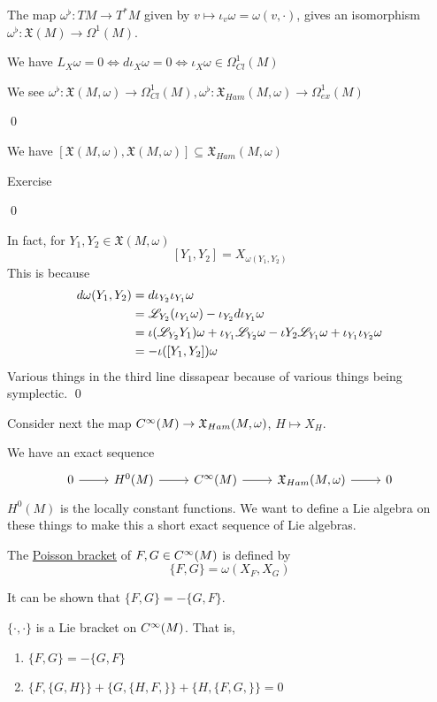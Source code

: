 \documentclass[x11names,reqno,14pt]{extarticle}
\newcommand{\mk}[1]{\mathfrak{#1}}
\newcommand{\pois}[2]{\{#1,#2\}}
\begin{document}
\proof

The map $\omega^\flat:TM\to T^*M$ given by $v \mapsto \iota_v\omega = \omega(v,\cdot)$, gives an isomorphism $\omega^\flat:\mk{X}(M)\to\Omega^1(M)$. 

We have $L_X\omega=0 \iff d\iota_X\omega = 0 \iff \iota_X\omega \in \Omega^1_{Cl}(M)$

We see $\omega^\flat:\mk{X}(M,\omega)\to \Omega^1_{Cl}(M), \omega^\flat:\mk{X}_{Ham}(M,\omega) \to \Omega^1_{ex}(M)$

\qed

\prop

We have $[\mk{X}(M,\omega),\mk{X}(M,\omega)]\subseteq\mk{X}_{Ham}(M,\omega)$

\proof

Exercise

\qed

\prop


In fact, for $Y_1,Y_2 \in \mk{X}(M,\omega)$
\[
[Y_1,Y_2] = X_{\omega(Y_1,Y_2)}
\]
\proof
This is because 
\begin{align*}
d\omega(Y_1,Y_2) & = d\iota_{Y_2}\iota_{Y_1}\omega \\
& = \mathscr{L}_{Y_2}(\iota_{Y_1}\omega) - \iota_{Y_2}d\iota_{Y_1}\omega \\
& = \iota(\mathscr{L}_{Y_2}Y_1)\omega + \iota_{Y_1}\mathscr{L}_{Y_2}\omega - \iota{Y_2}\mathscr{L}_{Y_1}\omega + \iota_{Y_1}\iota_{Y_2}\omega \\
& = -\iota([Y_1,Y_2])\omega
\end{align*}
Various things in the third line dissapear because of various things being symplectic.
\qed

Consider next the map $C^\oo(M) \to \mk{X}_{Ham}(M,\omega)$, $H \mapsto X_H$.

We have an exact sequence
\[
\exactshort{H^0(M)}{}{C^\oo(M)}{}{\mk{X}_{Ham}(M,\omega)}
\]
$H^0(M)$ is the locally constant functions. We want to define a Lie algebra on these things to make this a short exact sequence of Lie algebras. 


The \underline{Poisson bracket} of $F, G \in C^\infty(M)$ is defined by 
\[
\{F, G\} = \omega(X_F,X_G)
\]

It can be shown that $\{F,G\} = -\{G,F\}$.

\prop

$\{\cdot,\cdot\}$ is a Lie bracket on $C^\infty(M)$. That is, 
\begin{enumerate}

\item $\{F,G\}=-\{G,F\}$

\item $\pois{F}{\pois{G}{H}} + \pois{G}{\pois{H,F}} + \pois{H}{\pois{F,G}} = 0$
\end{enumerate}
\end{document}
